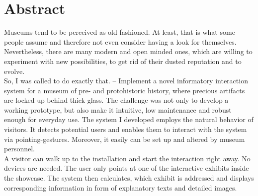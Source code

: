 \chapter*{Abstract}
\label{abstract}


Museums tend to be perceived as old fashioned. At least, that is what some people assume and therefore not even consider having a look for themselves. Nevertheless, there are many modern and open minded ones, which are willing to experiment with new possibilities, to get rid of their dusted reputation and to evolve.
\\
So, I was called to do exactly that. -- Implement a novel informatory interaction system for a museum of pre- and protohistoric history, where precious artifacts are locked up behind thick glass. The challenge was not only to develop a working prototype, but also make it intuitive, low maintenance and robust enough for everyday use. The system I developed employs the natural behavior of visitors. It detects potential users and enables them to interact with the system via pointing-gestures. Moreover, it easily can be set up and altered by museum personnel.
\\
A visitor can walk up to the installation and start the interaction right away. No devices are needed. The user only points at one of the interactive exhibits inside the showcase. The system then calculates, which exhibit is addressed and displays corresponding information in form of explanatory texts and detailed images. 

%
%
%

